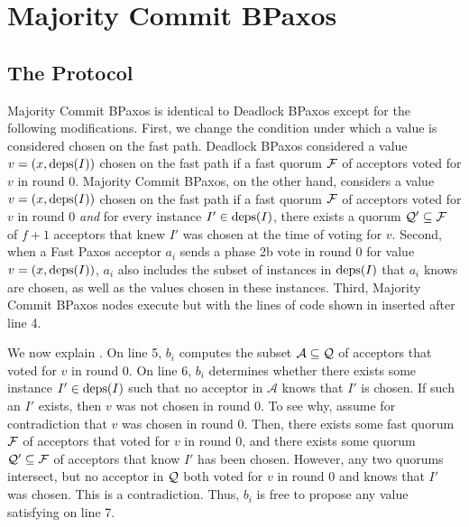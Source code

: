 \section{Majority Commit BPaxos}
\subsection{The Protocol}
Majority Commit BPaxos is identical to Deadlock BPaxos except for the following
modifications.
%
First, we change the condition under which a value is considered chosen on the
fast path.
%
Deadlock BPaxos considered a value $v = (x, \text{deps}(I))$ chosen on the fast path
if a fast quorum $\mathcal{F}$ of acceptors voted for $v$ in round $0$.
%
Majority Commit BPaxos, on the other hand, considers a value $v = (x,
\text{deps}(I))$ chosen on the fast path if a fast quorum $\mathcal{F}$ of acceptors
voted for $v$ in round $0$ \emph{and} for every instance $I' \in \text{deps}(I)$,
there exists a quorum $\mathcal{Q}' \subseteq \mathcal{F}$ of $f + 1$ acceptors
that knew $I'$ was chosen at the time of voting for $v$.
%
Second, when a Fast Paxos acceptor $a_i$ sends a phase 2b vote in round $0$ for
value $v = (x, \text{deps}(I))$, $a_i$ also includes the subset of instances in
$\text{deps}(I)$ that $a_i$ knows are chosen, as well as the values chosen in these
instances.
%
Third, Majority Commit BPaxos nodes execute  but with
the lines of code shown in  inserted after line
4.



We now explain . On line 5, $b_i$ computes the
subset $\mathcal{A} \subseteq \mathcal{Q}$ of acceptors that voted for $v$ in round
$0$. On line 6, $b_i$ determines whether there exists some instance $I' \in
\text{deps}(I)$ such that no acceptor in $\mathcal{A}$ knows that $I'$ is chosen. If
such an $I'$ exists, then $v$ was not chosen in round $0$. To see why, assume
for contradiction that $v$ was chosen in round $0$. Then, there exists some
fast quorum $\mathcal{F}$ of acceptors that voted for $v$ in round $0$, and
there exists some quorum $\mathcal{Q}' \subseteq \mathcal{F}$ of acceptors that
know $I'$ has been chosen. However, any two quorums intersect, but no acceptor
in $\mathcal{Q}$ both voted for $v$ in round $0$ and knows that $I'$ was chosen.
This is a contradiction. Thus, $b_i$ is free to propose any value satisfying
 on line 7.

